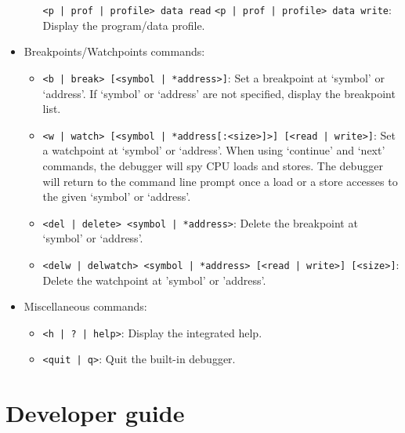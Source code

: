 \begin{itemize}
\begin{itemize}
	\texttt{<p | prof | profile> data read} \newline
	\texttt{<p | prof | profile> data write}: \newline
	Display the program/data profile.
	\end{itemize}
\item Breakpoints/Watchpoints commands:
	\begin{itemize}
	\item \texttt{<b | break> [<symbol | *address>]}: \newline
	Set a breakpoint at `symbol' or `address'. If `symbol' or `address' are not specified, display the breakpoint list.
	\item \texttt{<w | watch> [<symbol | *address[:<size>]>] [<read | write>]}: \newline
	Set a watchpoint at `symbol' or `address'. When using `continue' and `next' commands, the debugger will spy CPU loads and stores. The debugger will return to the command line prompt once a load or a store accesses to the given `symbol' or `address'.
	\item \texttt{<del | delete> <symbol | *address>}: \newline
	Delete the breakpoint at `symbol' or `address'.
	\item \texttt{<delw | delwatch> <symbol | *address> [<read | write>] [<size>]}: \newline
	Delete the watchpoint at 'symbol' or 'address'.
	\end{itemize}
\item Miscellaneous commands:
	\begin{itemize}
	\item \texttt{<h | ? | help>}: \newline
	Display the integrated help.
	\item \texttt{<quit | q>}: \newline
	Quit the built-in debugger.
	\end{itemize}
\end{itemize}

\newpage
\section{Developer guide}

